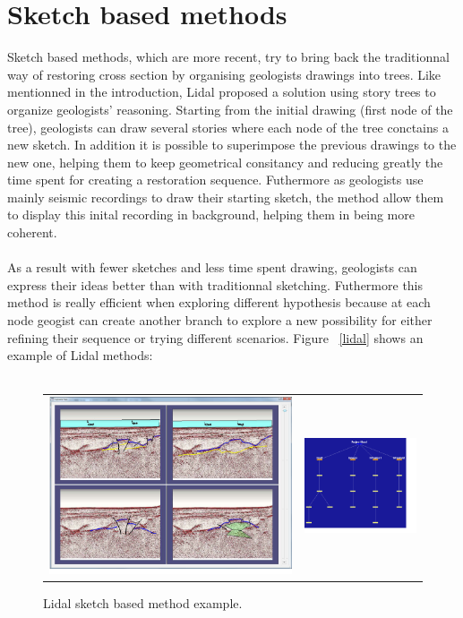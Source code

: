 \documentclass[12pt, a4paper]{report} %
\begin{document}
\section{Sketch based methods}

Sketch based methods, which are more recent, try to bring back the traditionnal way of restoring cross section by organising geologists drawings into trees.
Like mentionned in the introduction, Lidal \cite{lidal} proposed a solution using story trees to organize geologists' reasoning. Starting from the initial drawing (first node of the tree), geologists can draw several stories where each node of the tree conctains a new sketch. In addition it is possible to superimpose the previous drawings to the new one, helping them to keep geometrical consitancy and reducing greatly the time spent for creating a restoration sequence. Futhermore as geologists use mainly seismic recordings to draw their starting sketch, the method allow them to display this inital recording in background, helping them in being more coherent.\\\\
 As a result with fewer sketches and less time spent drawing, geologists can express their ideas better than with traditionnal sketching. Futhermore this method is really efficient when exploring different hypothesis  because at each node geogist can create another branch to explore a new possibility for either refining their sequence or trying different scenarios. Figure ~\ref{lidal} shows an example of Lidal methods:\\\\
 \begin{figure}[htb]
\centering
\begin{tabular}{@{}cc@{}}
\includegraphics[width=.45\textwidth]{lidal0.png}&
\includegraphics[width=.45\textwidth]{lidal1.png}\\
\end{tabular}
\caption{Lidal sketch based method example.}
\label{lidal}
\label{unerodeeg}
\end{figure}\\\\
\end{document}
